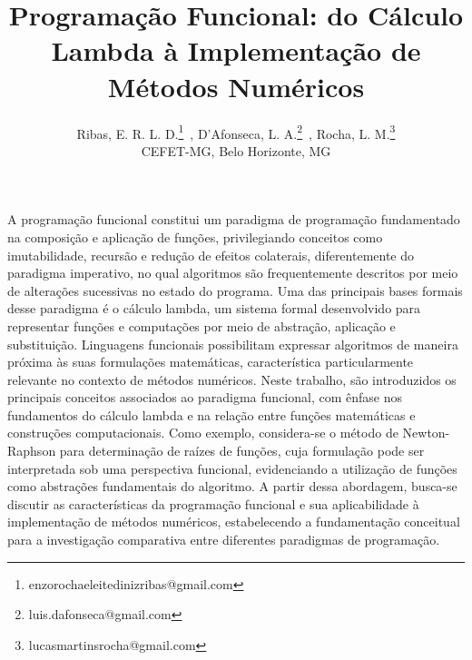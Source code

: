 \documentclass{pssbmac}
\begin{document}
\title{Programação Funcional: do Cálculo Lambda à Implementação de Métodos Numéricos}

\author{
{\large Ribas, E. R. L. D.}\thanks{enzorochaeleitedinizribas@gmail.com}\, ,
{\large D'Afonseca, L. A.}\thanks{luis.dafonseca@gmail.com}\, ,
{\large Rocha, L. M.}\thanks{lucasmartinsrocha@gmail.com}  \\
{\small CEFET-MG, Belo Horizonte, MG} \\
}
\criartitulo
\vspace{-.5cm}
A programação funcional constitui um paradigma de programação fundamentado na composição e aplicação de funções, privilegiando conceitos como imutabilidade, recursão e redução de efeitos colaterais, diferentemente do paradigma imperativo, no qual algoritmos são frequentemente descritos por meio de alterações sucessivas no estado do programa. Uma das principais bases formais desse paradigma é o cálculo lambda, um sistema formal desenvolvido para representar funções e computações por meio de abstração, aplicação e substituição. Linguagens funcionais possibilitam expressar algoritmos de maneira próxima às suas formulações matemáticas, característica particularmente relevante no contexto de métodos numéricos. Neste trabalho, são introduzidos os principais conceitos associados ao paradigma funcional, com ênfase nos fundamentos do cálculo lambda e na relação entre funções matemáticas e construções computacionais. Como exemplo, considera-se o método de Newton-Raphson para determinação de raízes de funções, cuja formulação pode ser interpretada sob uma perspectiva funcional, evidenciando a utilização de funções como abstrações fundamentais do algoritmo. A partir dessa abordagem, busca-se discutir as características da programação funcional e sua aplicabilidade à implementação de métodos numéricos, estabelecendo a fundamentação conceitual para a investigação comparativa entre diferentes paradigmas de programação.

\end{document}
